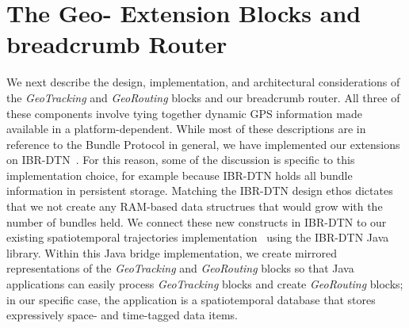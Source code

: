 \documentclass{sig-alternate}
\begin{document}
\CopyrightYear
\crdata










%
%




%
%

\section{The Geo- Extension Blocks and {\sc breadcrumb} Router}
We next describe the design, implementation, and architectural
considerations of the {\em GeoTracking} and {\em GeoRouting} blocks
and our {\sc breadcrumb} router. All three of these components involve
tying together dynamic GPS information made available in a
platform-dependent. While most of these descriptions are in reference
to the Bundle Protocol in general, we have implemented our extensions
on IBR-DTN~\cite{IBR-DTN-WASA}. For this reason, some of the
discussion is specific to this implementation choice, for example
because IBR-DTN holds all bundle information in persistent
storage. Matching the IBR-DTN design ethos dictates that we not create
any RAM-based data structrues that would grow with the number of
bundles held.  We connect these new constructs in IBR-DTN to our
existing spatiotemporal trajectories
implementation~\cite{michel12:spatiotemporal} using the IBR-DTN Java
library. Within this Java bridge implementation, we create mirrored
representations of the {\em GeoTracking} and {\em GeoRouting} blocks
so that Java applications can easily process {\em GeoTracking} blocks
and create {\em GeoRouting} blocks; in our specific case, the
application is a spatiotemporal database that stores expressively
space- and time-tagged data items.
\end{document}
